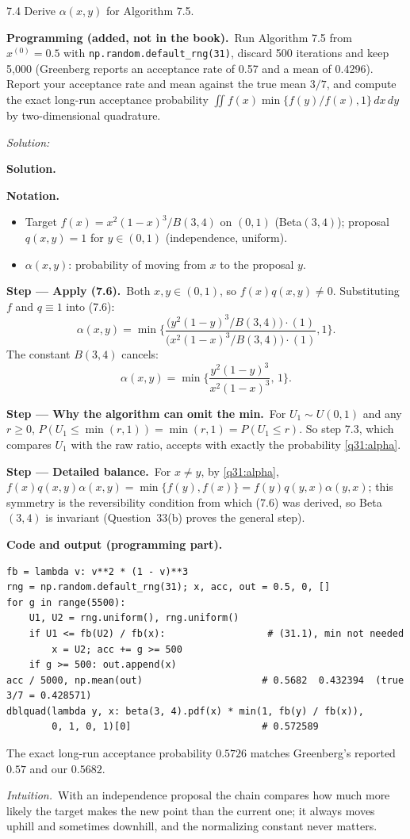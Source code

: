 \documentclass[11pt,a4paper]{article}
\newif\ifsolucoes
\newcommand{\espacoresol}{4.5cm}   %
\numberwithin{equation}{questao}   %
\newcommand{\programacao}{\par\smallskip\noindent\textbf{Programming (added, not in the book).}~}
\newenvironment{notacao}{\par\smallskip\noindent\textbf{Notation.}\begin{itemize}[leftmargin=1.4em,topsep=1pt,itemsep=0pt]\small}{\end{itemize}}
\newcommand{\resolespaco}{\ifsolucoes\else\par\textit{Solution:}\vspace{\espacoresol}\par\fi}
\newcommand{\passo}[2]{\par\smallskip\noindent\textbf{Step --- #1.}~#2}
\newcommand{\intuicao}[1]{\par\smallskip\noindent\textit{Intuition.}~#1}
\newcommand{\refbib}[1]{\par\smallskip\noindent{\footnotesize\color{black!60}\textbf{Ref:} #1}}
\newcommand{\solhead}{\par\medskip\noindent{\color{blue!55!black}\rule{\linewidth}{0.3pt}}\par\noindent\textbf{Solution.}}
\newcommand{\codehead}{\par\smallskip\noindent\textbf{Code and output (programming part).}\par}
\newcommand{\1}{\mathbf{1}}
\begin{document}
7.4 Derive $\alpha(x,y)$ for Algorithm 7.5.
\programacao Run Algorithm 7.5 from $x^{(0)}=0.5$ with \texttt{np.random.default\_rng(31)}, discard
500 iterations and keep 5{,}000 (Greenberg reports an acceptance rate of 0.57 and a mean of 0.4296).
Report your acceptance rate and mean against the true mean $3/7$, and compute the exact long-run
acceptance probability $\iint f(x)\min\{f(y)/f(x),1\}\,dx\,dy$ by two-dimensional quadrature.
\resolespaco
\begin{sol}
\solhead
\begin{notacao}
\item Target $f(x)=x^2(1-x)^3/B(3,4)$ on $(0,1)$ (Beta$(3,4)$); proposal $q(x,y)=1$ for $y\in(0,1)$ (independence, uniform).
\item $\alpha(x,y)$: probability of moving from $x$ to the proposal $y$.
\end{notacao}

\passo{Apply (7.6)}{Both $x,y\in(0,1)$, so $f(x)q(x,y)\neq0$. Substituting $f$ and $q\equiv1$ into (7.6):}
\[
\alpha(x,y)=\min\Big\{\frac{\big(y^2(1-y)^3/B(3,4)\big)\cdot(1)}{\big(x^2(1-x)^3/B(3,4)\big)\cdot(1)},1\Big\}.
\]
The constant $B(3,4)$ cancels:
\begin{equation}\label{q31:alpha}
\alpha(x,y)=\min\Big\{\frac{y^2(1-y)^3}{x^2(1-x)^3},\,1\Big\}.
\end{equation}

\passo{Why the algorithm can omit the min}{For $U_1\sim U(0,1)$ and any $r\ge0$,
$P(U_1\le\min(r,1))=\min(r,1)=P(U_1\le r)$. So step 7.3, which compares $U_1$ with the raw ratio,
accepts with exactly the probability \eqref{q31:alpha}.}

\passo{Detailed balance}{For $x\ne y$, by \eqref{q31:alpha},
$f(x)q(x,y)\alpha(x,y)=\min\{f(y),f(x)\}=f(y)q(y,x)\alpha(y,x)$; this symmetry is the reversibility
condition from which (7.6) was derived, so Beta$(3,4)$ is invariant (Question~33(b) proves the
general step).}

\codehead
{\small
\begin{verbatim}
fb = lambda v: v**2 * (1 - v)**3
rng = np.random.default_rng(31); x, acc, out = 0.5, 0, []
for g in range(5500):
    U1, U2 = rng.uniform(), rng.uniform()
    if U1 <= fb(U2) / fb(x):                  # (31.1), min not needed
        x = U2; acc += g >= 500
    if g >= 500: out.append(x)
acc / 5000, np.mean(out)                     # 0.5682  0.432394  (true 3/7 = 0.428571)
dblquad(lambda y, x: beta(3, 4).pdf(x) * min(1, fb(y) / fb(x)),
        0, 1, 0, 1)[0]                       # 0.572589
\end{verbatim}
}
The exact long-run acceptance probability $0.5726$ matches Greenberg's reported $0.57$ and our
$0.5682$.

\intuicao{With an independence proposal the chain compares how much more likely the target makes
the new point than the current one; it always moves uphill and sometimes downhill, and the
normalizing constant never matters.}
\refbib{Greenberg (2008), §7.2 (pp.~97--100).}
\end{sol}
\end{document}
